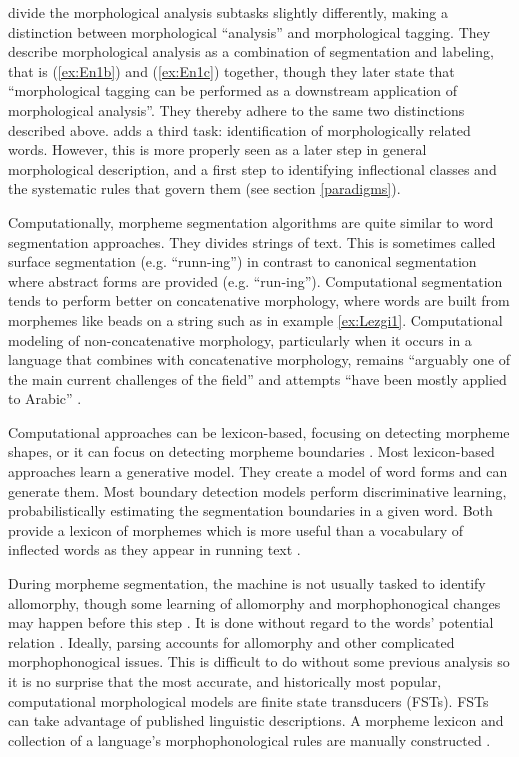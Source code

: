 \documentclass[12pt]{article}
\begin{document}
 divide the morphological analysis subtasks slightly differently, making a distinction between morphological “analysis” and morphological tagging. They describe morphological analysis as a combination of segmentation and labeling, that is (\ref{ex:En1b}) and (\ref{ex:En1c}) together, though they later state that ``morphological tagging can be performed as a downstream application of morphological analysis''.
They thereby adhere to the same two distinctions described above.  adds a third task: identification of morphologically related words. However, this is more properly seen as a later step in general morphological description, and a first step to identifying inflectional classes and the systematic rules that govern them (see section \ref{paradigms}).

Computationally, morpheme segmentation algorithms are quite similar to word segmentation approaches. They divides strings of text. This is sometimes called surface segmentation (e.g. ``runn-ing'') in contrast to canonical segmentation where abstract forms are provided (e.g. ``run-ing''). Computational segmentation tends to perform better on concatenative morphology, where words are built from morphemes like beads on a string such as in example \ref{ex:Lezgi1}. Computational modeling of non-concatenative morphology, particularly when it occurs in a language that combines with concatenative morphology, remains ``arguably one of the main current challenges of the field'' and attempts ``have been mostly applied to Arabic'' \cite{goldsmith_computational_2017}.

Computational approaches can be lexicon-based, focusing on detecting morpheme shapes, or it can focus on detecting morpheme boundaries \cite{goodman_generation_2013}. Most lexicon-based approaches learn a generative model. They create a model of word forms and can generate them. Most boundary detection models perform discriminative learning, probabilistically estimating the segmentation boundaries in a given word. Both provide a lexicon of morphemes which is more useful than a vocabulary of inflected words as they appear in running text \cite{creutz_unsupervised_2002}.  

During morpheme segmentation, the machine is not usually tasked to identify allomorphy, though some learning of allomorphy and morphophonogical changes may happen before this step \cite{goldsmith_computational_2017}. It is done without regard to the words' potential relation \cite{virpioja_empirical_2011}. Ideally, parsing accounts for allomorphy and other complicated morphophonogical issues. This is difficult to do without some previous analysis so it is no surprise that the most accurate, and historically most popular, computational morphological models are finite state transducers (FSTs). FSTs can take advantage of published linguistic descriptions. A morpheme lexicon and collection of a language's morphophonological rules are manually constructed \cite{beesley_finite-state_2003}. 
\end{document}
